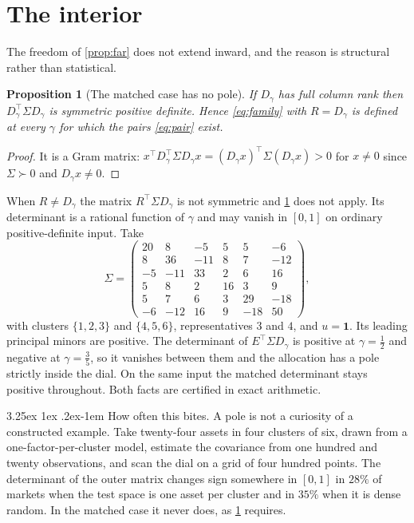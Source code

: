 \documentclass[11pt]{article}
\makeatletter
\renewcommand\paragraph{\@startsection{paragraph}{4}{\z@}%
  {3.25ex \@plus1ex \@minus.2ex}{-1em}%
  {\normalfont\normalsize\itshape}}
\newcommand{\ones}{\mathbf{1}}
\newtheorem{proposition}{Proposition}
\makeatother
\begin{document}
\section{The interior}
\label{sec:interior}

The freedom of \cref{prop:far} does not extend inward, and the reason is
structural rather than statistical.

\begin{proposition}[The matched case has no pole]
\label{prop:nopole}
If $D_\gamma$ has full column rank then $D_\gamma^\top\Sigma D_\gamma$ is
symmetric positive definite. Hence \eqref{eq:family} with $R=D_\gamma$ is
defined at every $\gamma$ for which the pairs \eqref{eq:pair} exist.
\end{proposition}

\begin{proof}
It is a Gram matrix: $x^\top D_\gamma^\top\Sigma D_\gamma x=(D_\gamma x)^\top
\Sigma(D_\gamma x)>0$ for $x\neq0$ since $\Sigma\succ0$ and $D_\gamma x\neq0$.
\end{proof}

When $R\neq D_\gamma$ the matrix $R^\top\Sigma D_\gamma$ is not symmetric and
\cref{prop:nopole} does not apply. Its determinant is a rational function of
$\gamma$ and may vanish in $[0,1]$ on ordinary positive-definite input. Take
\[
  \Sigma=\begin{pmatrix}
    20 & 8 & -5 & 5 & 5 & -6\\
    8 & 36 & -11 & 8 & 7 & -12\\
    -5 & -11 & 33 & 2 & 6 & 16\\
    5 & 8 & 2 & 16 & 3 & 9\\
    5 & 7 & 6 & 3 & 29 & -18\\
    -6 & -12 & 16 & 9 & -18 & 50
  \end{pmatrix},
\]
with clusters $\{1,2,3\}$ and $\{4,5,6\}$, representatives $3$ and $4$, and
$u=\ones$. Its leading principal minors are positive. The determinant of
$E^\top\Sigma D_\gamma$ is positive at $\gamma=\tfrac12$ and negative at
$\gamma=\tfrac35$, so it vanishes between them and the allocation has a pole
strictly inside the dial. On the same input the matched determinant stays
positive throughout. Both facts are certified in exact arithmetic.

\paragraph{How often this bites.} A pole is not a curiosity of a constructed
example. Take twenty-four assets in four clusters of six, drawn from a
one-factor-per-cluster model, estimate the covariance from one hundred and
twenty observations, and scan the dial on a grid of four hundred points. The
determinant of the outer matrix changes sign somewhere in $[0,1]$ in $28\%$ of
markets when the test space is one asset per cluster and in $35\%$ when it is
dense random. In the matched case it never does, as \cref{prop:nopole} requires.
\end{document}
